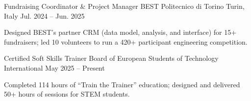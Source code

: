 
\begin{cventries}

  \cventry
    {Fundraising Coordinator \& Project Manager} %
    {BEST Politecnico di Torino} %
    {Turin, Italy} %
    {Jul. 2024 -- Jun. 2025} %
    {
      \begin{cvitems} %
        \item {Designed BEST's partner CRM (data model, analysis, and interface) for 15+ fundraisers; led 10 volunteers to run a 420+ participant engineering competition.}
      \end{cvitems}
    }

  \cventry
    {Certified Soft Skills Trainer} %
    {Board of European Students of Technology} %
    {International} %
    {May 2025 -- Present} %
    {
      \begin{cvitems} %
        \item {Completed 114 hours of ``Train the Trainer'' education; designed and delivered 50+ hours of sessions for STEM students.}
      \end{cvitems}
    }

\end{cventries}
